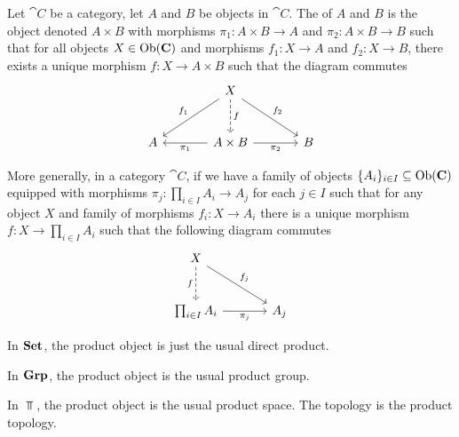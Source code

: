 
\begin{node}\label{universal-prop-0003}%
\begin{definition}\label{universal-prop-0004}%
Let $\cat{C}$ be a category, let $A$ and $B$ be objects in
$\cat{C}$. The  of $A$ and $B$ is the object
denoted $A\times B$ with morphisms $\pi_{1}\colon A\times B\to A$ and
$\pi_{2}\colon A\times B\to B$ such that for all objects $X\in\operatorname{Ob}(\mathbf{C})$
and morphisms $f_{1}\colon X\to A$ and $f_{2}\colon X\to B$, there
exists a unique morphism $f\colon X\to A\times B$ such that the diagram
commutes
\begin{equation*}
\begin{tikzcd}[sep=large]
  & \arrow[dl,swap,"f_{1}"] X \arrow[d,dashed,"f"] \arrow[dr,"f_{2}"] & \\
A & \ar[l,"\pi_{1}"] A\times B \ar[r,swap,"\pi_{2}"] & B
\end{tikzcd}
\end{equation*}
\end{definition}

\begin{definition}\label{universal-prop-0009}%
More generally, in a category $\cat{C}$,
if we have a family of objects $\{A_{i}\}_{i\in I}\subseteq\operatorname{Ob}(\mathbf{C})$
equipped with morphisms $\pi_{j}\colon\prod_{i\in I}A_{i}\to A_{j}$ for
each $j\in I$ such
that for any object $X$ and family of morphisms 
$f_{i}\colon X\to A_{i}$ there is a unique morphism $f\colon X\to\prod_{i\in I}A_{i}$
such that the following diagram commutes
\begin{equation*}
\begin{tikzcd}[sep=large]
  X\arrow[dr,"f_{j}"]\arrow[d,swap,dashed,"f"]  & \\
\prod_{i\in I}A_{i} \arrow[r,swap,"\pi_{j}"] & A_{j}
\end{tikzcd}
\end{equation*}
\end{definition}

\begin{node}[Examples]\label{universal-prop-0007}%
\begin{node}\label{universal-prop-0005}%
In $\mathbf{Set}$, the product object is just the usual direct product.
\end{node}

\begin{node}\label{universal-prop-0006}%
In $\mathbf{Grp}$, the product object is the usual product group.
\end{node}

\begin{node}\label{universal-prop-0008}%
In $\Top$, the product object is the usual product space. The topology
is the product topology.
\end{node}
\end{node} %
\end{node}


